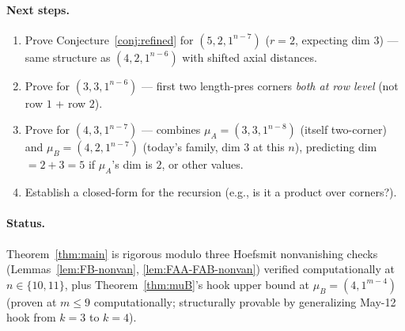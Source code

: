\documentclass[11pt]{article}
\theoremstyle{definition}
\begin{document}
\paragraph{Next steps.}
\begin{enumerate}[leftmargin=2em,topsep=0.3em,itemsep=0.2em,label=(\arabic*)]
\item Prove Conjecture~\ref{conj:refined} for $(5, 2, 1^{n-7})$
($r = 2$, expecting dim $3$) — same structure as
$(4, 2, 1^{n-6})$ with shifted axial distances.
\item Prove for $(3, 3, 1^{n-6})$ — first two length-pres corners
\emph{both at row level} (not row $1$ + row $2$).
\item Prove for $(4, 3, 1^{n-7})$ — combines $\mu_A = (3, 3, 1^{n-8})$
(itself two-corner) and $\mu_B = (4, 2, 1^{n-7})$ (today's family,
dim $3$ at this $n$), predicting dim $= 2 + 3 = 5$ if
$\mu_A$'s dim is $2$, or other values.
\item Establish a closed-form for the recursion (e.g., is it a
product over corners?).
\end{enumerate}

\paragraph{Status.}
Theorem~\ref{thm:main} is rigorous modulo three Hoefsmit
nonvanishing checks (Lemmas~\ref{lem:FB-nonvan},
\ref{lem:FAA-FAB-nonvan}) verified computationally at
$n \in \{10, 11\}$, plus Theorem~\ref{thm:muB}'s hook upper bound
at $\mu_B = (4, 1^{m-4})$ (proven at $m \le 9$ computationally;
structurally provable by generalizing May-12 hook from $k = 3$ to
$k = 4$).
\end{document}
